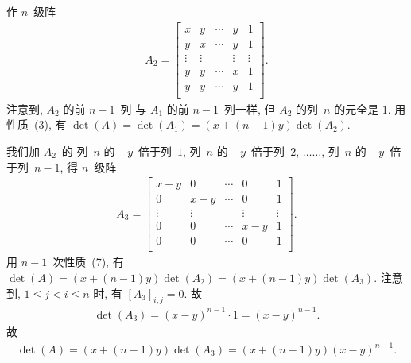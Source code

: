 \begin{example}
    作 \(n\)~级阵
    \begin{align*}
        A_2 =
        \begin{bmatrix}
            x      & y      & \cdots & y      & 1      \\
            y      & x      & \cdots & y      & 1      \\
            \vdots & \vdots & {}     & \vdots & \vdots \\
            y      & y      & \cdots & x      & 1      \\
            y      & y      & \cdots & y      & 1      \\
        \end{bmatrix}.
    \end{align*}
    注意到, \(A_2\) 的前 \(n-1\)~列%
    与 \(A_1\) 的前 \(n-1\)~列一样,
    但 \(A_2\) 的列~\(n\) 的元全是 \(1\).
    用性质~(3), 有
    \(\det {(A)} = \det {(A_1)}
    = (x + (n-1)y) \det {(A_2)}\).

    我们加 \(A_2\)~的%
    列~\(n\) 的 \(-y\)~倍于列~\(1\),
    列~\(n\) 的 \(-y\)~倍于列~\(2\),
    \(\dots \dots\),
    列~\(n\) 的 \(-y\)~倍于列~\(n-1\),
    得 \(n\)~级阵
    \begin{align*}
        A_3 =
        \begin{bmatrix}
            x-y    & 0      & \cdots & 0      & 1      \\
            0      & x-y    & \cdots & 0      & 1      \\
            \vdots & \vdots & {}     & \vdots & \vdots \\
            0      & 0      & \cdots & x-y    & 1      \\
            0      & 0      & \cdots & 0      & 1      \\
        \end{bmatrix}.
    \end{align*}
    用 \(n-1\)~次性质~(7), 有
    \(\det {(A)}
    = (x + (n-1)y) \det {(A_2)}
    = (x + (n-1)y) \det {(A_3)}\).
    注意到,
    \(1 \leq j < i \leq n\) 时,
    有 \([A_3]_{i,j} = 0\).
    故
    \begin{align*}
        \det {(A_3)} = (x-y)^{n-1} \cdot 1 = (x-y)^{n-1}.
    \end{align*}
    故
    \begin{align*}
        \det {(A)}
        = (x + (n-1)y) \det {(A_3)}
        = (x + (n-1)y) (x-y)^{n-1}.
    \end{align*}
\end{example}

